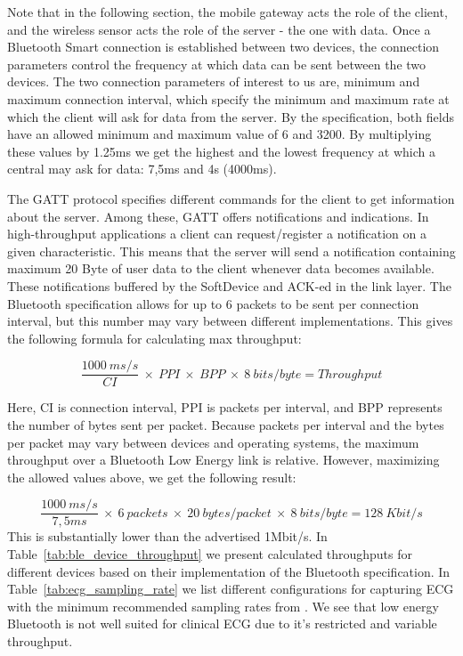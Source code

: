 Note that in the following section, the mobile gateway acts the role of the client, and the wireless sensor acts the role of the server - the one with data. Once a Bluetooth Smart connection is established between two devices, the connection parameters \cite{newRef_59} control the frequency at which data can be sent between the two devices. The two connection parameters of interest to us are, minimum and maximum connection interval, which specify the minimum and maximum rate at which the client will ask for data from the server. By the specification, both fields have an allowed minimum and maximum value of 6 and 3200. By multiplying these values by 1.25ms we get the highest and the lowest frequency at which a central may ask for data: 7,5ms and 4s (4000ms).

The GATT protocol specifies different commands for the client to get information about the server. Among these, GATT offers notifications and indications. In high-throughput applications a client can request/register a notification on a given characteristic. This means that the server will send a notification containing maximum 20 Byte of user data to the client whenever data becomes available. These notifications buffered by the SoftDevice and ACK-ed in the link layer. The Bluetooth specification allows for up to 6 packets to be sent per connection interval, but this number may vary between different implementations. This gives the following formula for calculating max throughput:

\[
\frac{1000\: ms/s}{CI}\: \times\: PPI\: \times\: BPP\: \times\: 8\: bits/byte = Throughput
\]

\newline
\noindent
Here, CI is connection interval, PPI is packets per interval, and BPP represents the number of bytes sent per packet. Because packets per interval and the bytes per packet may vary between devices and operating systems, the maximum throughput over a Bluetooth Low Energy link is relative. However, maximizing the allowed values above, we get the following result: 

\[
\frac{1000\: ms/s}{7,5ms}\: \times\: 6\: packets\: \times\: 20\:bytes/packet\: \times\: 8\: bits/byte = 128\:Kbit/s
\]
\newline
\noindent
This is substantially lower than the advertised 1Mbit/s. In Table~\ref{tab:ble_device_throughput}  we present calculated throughputs for different devices based on their implementation of the Bluetooth specification. In Table~\ref{tab:ecg_sampling_rate} we list different configurations for capturing ECG with the minimum recommended sampling rates from \cite{Anonymous:j4z9MACD}. We see that low energy Bluetooth is not well suited for clinical ECG due to it's restricted and variable throughput.

